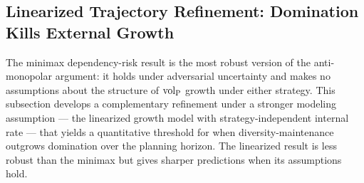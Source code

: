 \subsection{Linearized Trajectory Refinement: Domination Kills External Growth}
\label{sec:domination_kills}

The minimax dependency-risk result is the most robust version of the
anti-monopolar argument: it holds under adversarial uncertainty and makes
no assumptions about the structure of ${\operatorname{vol}_{\mathrm{P}}}$ growth under either
strategy. This subsection develops a complementary refinement under a
stronger modeling assumption --- the linearized growth model with
strategy-independent internal rate --- that yields a quantitative threshold
for when diversity-maintenance outgrows domination over the planning
horizon. The linearized result is less robust than the minimax but gives
sharper predictions when its assumptions hold.


